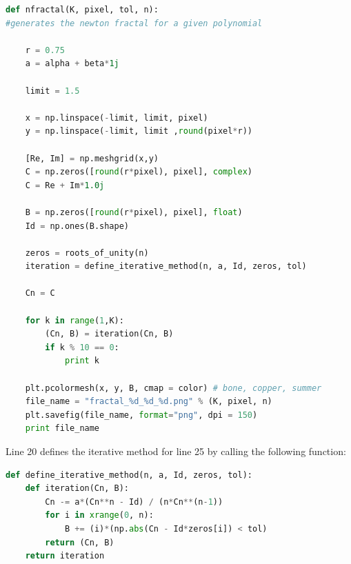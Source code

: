 \documentclass[12pt]{article}
\begin{document}
\begin{lstlisting}[language=Python, caption=Newton Fractal Function] 
def nfractal(K, pixel, tol, n):
#generates the newton fractal for a given polynomial

    r = 0.75
    a = alpha + beta*1j

    limit = 1.5

    x = np.linspace(-limit, limit, pixel)
    y = np.linspace(-limit, limit ,round(pixel*r))

    [Re, Im] = np.meshgrid(x,y)
    C = np.zeros([round(r*pixel), pixel], complex)
    C = Re + Im*1.0j

    B = np.zeros([round(r*pixel), pixel], float)
    Id = np.ones(B.shape)

    zeros = roots_of_unity(n)
    iteration = define_iterative_method(n, a, Id, zeros, tol)
    
    Cn = C
    
    for k in range(1,K):
        (Cn, B) = iteration(Cn, B)
        if k % 10 == 0:
            print k

    plt.pcolormesh(x, y, B, cmap = color) # bone, copper, summer
    file_name = "fractal_%d_%d_%d.png" % (K, pixel, n)
    plt.savefig(file_name, format="png", dpi = 150)
    print file_name
\end{lstlisting}
Line 20 defines the iterative method for line 25 by calling the following function:
\begin{lstlisting}[language=Python, caption=Definition of the Iterative Method]
def define_iterative_method(n, a, Id, zeros, tol):
    def iteration(Cn, B):
        Cn -= a*(Cn**n - Id) / (n*Cn**(n-1))
        for i in xrange(0, n):
            B += (i)*(np.abs(Cn - Id*zeros[i]) < tol)
        return (Cn, B)
    return iteration
\end{lstlisting}

\\

\end{document}
